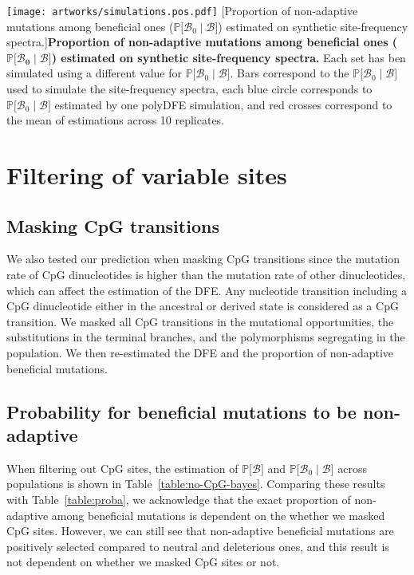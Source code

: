 \documentclass{article}
\newcommand{\proba}{\mathbb{P}}
\newcommand{\SphyBen}{\mathcal{B}_0}
\newcommand{\given}{\mid}
\newcommand{\SpopBen}{\mathcal{B}}
\begin{document}
    \begin{center}
        \texttt{[image: artworks/simulations.pos.pdf]}
        [Proportion of non-adaptive mutations among beneficial ones ($\proba{[}\SphyBen\given \SpopBen {]}$) estimated on synthetic site-frequency spectra.]{\textbf{Proportion of non-adaptive mutations among beneficial ones ($\bm{\proba{[}\SphyBen\given \SpopBen {]}}$) estimated on synthetic site-frequency spectra.} Each set has ben simulated using a different value for $\proba{[}\SphyBen\given \SpopBen {]}$. Bars correspond to the $\proba{[}\SphyBen\given \SpopBen {]}$ used to simulate the site-frequency spectra, each blue circle corresponds to $\proba{[}\SphyBen\given \SpopBen {]}$ estimated by one polyDFE simulation, and red crosses correspond to the mean of estimations across 10 replicates.\label{fig:simulations}}
    \end{center}


    \section{Filtering of variable sites}

    \subsection{Masking CpG transitions}
    We also tested our prediction when masking CpG transitions since the mutation rate of CpG dinucleotides is higher than the mutation rate of other dinucleotides, which can affect the estimation of the DFE.
    Any nucleotide transition including a CpG dinucleotide either in the ancestral or derived state is considered as a CpG transition.
    We masked all CpG transitions in the mutational opportunities, the substitutions in the terminal branches, and the polymorphisms segregating in the population. We then re-estimated the DFE and the proportion of non-adaptive beneficial mutations.

    \newpage
    \subsection{Probability for beneficial mutations to be non-adaptive}
    When filtering out CpG sites, the estimation of $\proba{[} \SpopBen {]}$ and $\proba{[}\SphyBen\given \SpopBen {]}$ across populations is shown in Table~\ref{table:no-CpG-bayes}.
    Comparing these results with Table~\ref{table:proba}, we acknowledge that the exact proportion of non-adaptive among beneficial mutations is dependent on the whether we masked CpG sites.
    However, we can still see that non-adaptive beneficial mutations are positively selected compared to neutral and deleterious ones, and this result is not dependent on whether we masked CpG sites or not.
\end{document}
